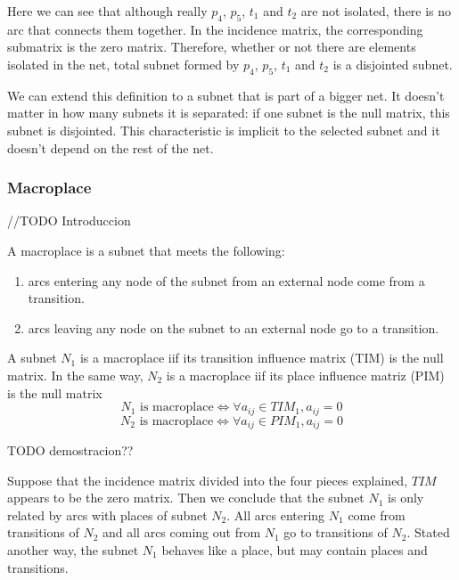 {\begin{example}
Here we can see that although really $p_4 $, $ p_5 $, $ t_1 $ and $ t_2 $ are not isolated, there is no arc that connects them together. In the incidence matrix, the corresponding submatrix is the zero matrix. Therefore, whether or not there are elements isolated in the net, total subnet formed by $ p_4 $, $ p_5 $, $ t_1 $ and $t_2$ is a disjointed subnet.

\end{example}

We can extend this definition to a subnet that is part of a bigger net. It
doesn't matter in how many subnets it is separated: if one subnet is the null
matrix, this subnet is disjointed. This characteristic is implicit to the selected subnet and it doesn't depend on the rest of the net.

\subsubsection{Macroplace}

//TODO Introduccion
\begin{definition}[Macroplace]
A macroplace is a subnet that meets the following:
\begin{enumerate}
 \item arcs entering any node of the subnet from an external node come from a transition.
 \item arcs leaving any node on the subnet to an external node go to a transition.
\end{enumerate}
\end{definition}

\begin{proposition}
A subnet $N_1$ is a macroplace iif its transition influence matrix (TIM) is the null matrix. In the same way, $N_2$ is a macroplace iif its place
influence matriz (PIM) is the null matrix
\[
N_1\mbox{ is macroplace} \iff \forall a_{ij} \in TIM_1, a_{ij} =
0
\]
\[
N_2\mbox{ is macroplace} \iff \forall a_{ij} \in PIM_1, a_{ij} =
0
\]
\end{proposition}
TODO demostracion??

Suppose that the incidence matrix divided into the four pieces explained, $TIM$ appears to be the zero matrix. Then we conclude that the subnet $N_1$ is only related by arcs with places of subnet $N_2$. All arcs entering $N_1$ come from transitions of $N_2$ and all arcs coming out from $N_1$ go to transitions of $N_2$. Stated another way, the subnet $N_1$ behaves like a place, but may contain places and transitions.

}
